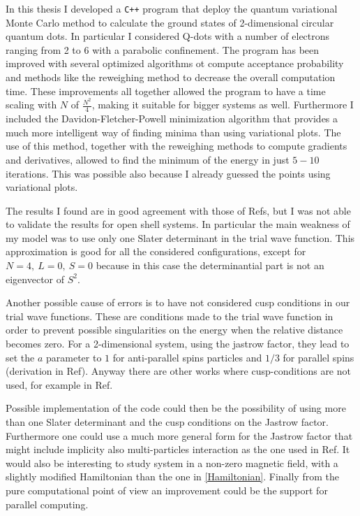 In this thesis I developed a \texttt{C++} program that deploy the quantum variational Monte Carlo method to calculate the ground states of 2-dimensional circular quantum dots.
In particular I considered Q-dots with a number of electrons ranging from 2 to 6 with a parabolic confinement.
The program has been improved with several optimized algorithms ot compute acceptance probability and methods like the reweighing method to decrease the overall computation time.
These improvements all together allowed the program to have a time scaling with $N$ of $\frac{N^2}{4}$, making it suitable for bigger systems as well.
Furthermore I included the Davidon-Fletcher-Powell minimization algorithm that provides a much more intelligent way of finding minima than using variational plots.
The use of this method, together with the reweighing methods to compute gradients and derivatives, allowed to find the minimum of the energy in just $5-10$ iterations.
This was possible also because I already guessed the points using variational plots.

The results I found are in good agreement with those of Refs\cite{larsevind,PedersenLohne2011}, but I was not able to validate the results for open shell systems.
In particular the main weakness of my model was to use only one Slater determinant in the trial wave function.
This approximation is good for all the considered configurations, except for $N=4,\>L=0,\>S=0$ because in this case the determinantial part is not an eigenvector of $S^2$\cite{Colletti2002}.

Another possible cause of errors is to have not considered cusp conditions in our trial wave functions. These are conditions made to the trial wave function in order to prevent possible singularities on the energy when the relative distance becomes zero.
For a 2-dimensional system, using the jastrow factor, they lead to set the $a$ parameter to $1$ for anti-parallel spins particles and $1/3$ for parallel spins (derivation in Ref\cite{larsevind}).
Anyway there are other works where cusp-conditions are not used, for example in Ref\cite{Harju1999}.

Possible implementation of the code could then be the possibility of using more than one Slater determinant and the cusp conditions on the Jastrow factor.
Furthermore one could use a much more general form for the Jastrow factor that might include implicity also multi-particles interaction as the one used in Ref\cite{Pederiva2000}.
It would also be interesting to study system in a non-zero magnetic field, with a slightly modified Hamiltonian than the one in \autoref{Hamiltonian}.
Finally from the pure computational point of view an improvement could be the support for parallel computing.
